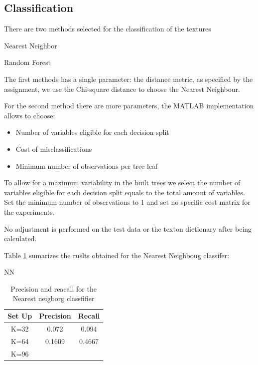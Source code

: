 \documentclass[a4paper]{article}
\begin{document}
\subsection{Classification}
There are two methods selected for the classification of the textures

\begin{description}

\item[Nearest Neighbor] \cite{}
\item[Random Forest] \cite{}

\end{description}

The first methods has a single parameter: the distance metric, as specified by the assignment, we use the Chi-square distance to choose the Nearest Neighbour.

For the second method there are more parameters, the MATLAB implementation allows to choose:

\begin{itemize}
	\item Number of variables eligible for each decision split
	\item Cost of misclassifications
	\item Minimum number of observations per tree leaf
\end{itemize}

To allow for a maximum variability in the built trees we select the number of variables eligible for each decision split equals to the total amount of variables. Set the minimum number of observations to 1 and set no specific cost matrix for the experiments.

No adjustment is performed on the test data or the texton dictionary after being calculated.

Table \ref{table:table1} sumarizes the ruslts obtained for the Nearest Neighboug classifer:

NN
\begin{table}[t]
\centering
\begin{tabular}{c | c | c}
Set Up & Precision & Recall   \\
\hline	
K=32 & 0.072 & 0.094 \\
K=64 & 0.1609 & 0.4667 \\
K=96 &  &  \\

\end{tabular}
\caption{Precision and reacall for the Nearest neigborg classfifier}
\label{table:table1}
\end{table}
\end{document}
